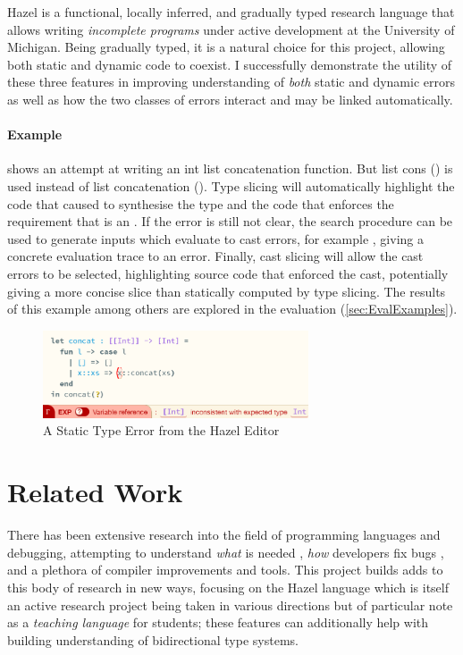 Hazel \cite{Hazel} is a functional, locally inferred, and gradually typed research language that allows writing \textit{incomplete programs} under active development at the University of Michigan. Being gradually typed, it is a natural choice for this project, allowing both static and dynamic code to coexist. I successfully demonstrate the utility of these three features in improving understanding of \textit{both} static and dynamic errors as well as how the two classes of errors interact and may be linked automatically.

\paragraph{Example}  shows an attempt at writing an int list concatenation function. But list cons (\code{::}) is used instead of list concatenation (). Type slicing will automatically highlight the code that caused  to synthesise the \code{[Int]} type and the code that enforces the requirement that  is an . If the error is still not clear, the search procedure can be used to generate inputs which evaluate to cast errors, for example , giving a concrete evaluation trace to an error. Finally, cast slicing will allow the cast errors to be selected, highlighting source code that enforced the cast, potentially giving a more concise slice than statically computed by type slicing. The results of this example among others are explored in the evaluation (\cref{sec:EvalExamples}).

\begin{figure}[h]
\centering
\includegraphics[width=0.7\textwidth]{Media/Figures/concat_error}
\caption{A Static Type Error from the Hazel Editor}
\label{fig:ErrorExample}
\end{figure}

\section{Related Work}
\label{sec:RelatedWork}
There has been extensive research into the field of programming languages and debugging, attempting to understand \textit{what} is needed \cite{DebugNeeds}, \textit{how} developers fix bugs \cite{HowFixBugs}, and a plethora of compiler improvements and tools. This project builds adds to this body of research in new ways, focusing on the Hazel language which is itself an active research project being taken in various directions but of particular note as a \textit{teaching language} \cite{HazelTutor} for students; these features can additionally help with building understanding of bidirectional type systems. 

